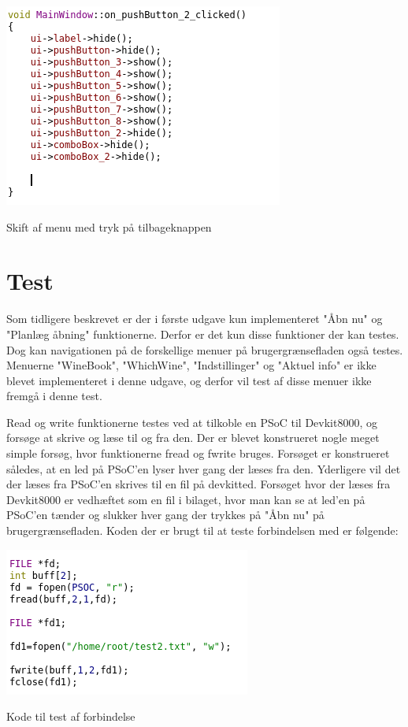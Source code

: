 \includegraphics{Billeder/tilbageKnap}
\caption{Skift af menu med tryk på tilbageknappen}


\section*{Test}

Som tidligere beskrevet er der i første udgave kun implementeret "Åbn nu" og "Planlæg åbning" funktionerne. Derfor er det kun disse funktioner der kan testes. Dog kan navigationen på de forskellige menuer på brugergrænsefladen også testes. Menuerne "WineBook", "WhichWine", "Indstillinger" og "Aktuel info" er ikke blevet implementeret i denne udgave, og derfor vil test af disse menuer ikke fremgå i denne test.

Read og write funktionerne testes ved at tilkoble en PSoC til Devkit8000, og forsøge at skrive og læse til og fra den. Der er blevet konstrueret nogle meget simple forsøg, hvor funktionerne fread og fwrite bruges. Forsøget er konstrueret således, at en led på PSoC'en lyser hver gang der læses fra den. Yderligere vil det der læses fra PSoC'en skrives til en fil på devkitted. Forsøget hvor der læses fra Devkit8000 er vedhæftet som en fil i bilaget, hvor man kan se at led'en på PSoC'en tænder og slukker hver gang der trykkes på "Åbn nu" på brugergrænsefladen. Koden der er brugt til at teste forbindelsen med er følgende:

\includegraphics{Billeder/testKode}
\caption{Kode til test af forbindelse}


